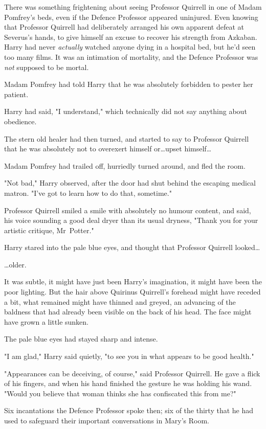There was something frightening about seeing Professor Quirrell in one of Madam
Pomfrey’s beds, even if the Defence Professor appeared uninjured. Even knowing
that Professor Quirrell had deliberately arranged his own apparent defeat at
Severus’s hands, to give himself an excuse to recover his strength from
Azkaban. Harry had never \emph{actually} watched anyone dying in a hospital
bed, but he’d seen too many films. It was an intimation of mortality, and the
Defence Professor was \emph{not} supposed to be mortal.

Madam Pomfrey had told Harry that he was absolutely forbidden to pester her
patient.

Harry had said, "I understand," which technically did not say anything about
obedience.

The stern old healer had then turned, and started to say to Professor Quirrell
that he was absolutely not to overexert himself or…upset himself…

Madam Pomfrey had trailed off, hurriedly turned around, and fled the room.

"Not bad," Harry observed, after the door had shut behind the escaping medical
matron. "I’ve got to learn how to do that, sometime."

Professor Quirrell smiled a smile with absolutely no humour content, and said,
his voice sounding a good deal dryer than its usual dryness, "Thank you for
your artistic critique, Mr~Potter."

Harry stared into the pale blue eyes, and thought that Professor Quirrell
looked…

…older.

It was subtle, it might have just been Harry’s imagination, it might have been
the poor lighting. But the hair above Quirinus Quirrell’s forehead might have
receded a bit, what remained might have thinned and greyed, an advancing of the
baldness that had already been visible on the back of his head. The face might
have grown a little sunken.

The pale blue eyes had stayed sharp and intense.

"I am glad," Harry said quietly, "to see you in what appears to be good health."

"Appearances can be deceiving, of course," said Professor Quirrell. He gave a
flick of his fingers, and when his hand finished the gesture he was holding his
wand. "Would you believe that woman thinks she has confiscated this from me?"

Six incantations the Defence Professor spoke then; six of the thirty that he
had used to safeguard their important conversations in Mary’s Room.

